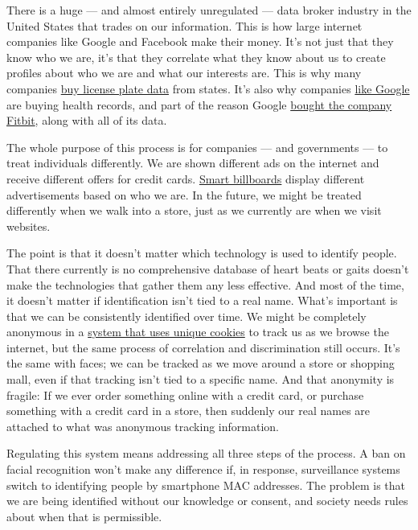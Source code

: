 There is a huge --- and almost entirely unregulated --- data broker
industry in the United States that trades on our information. This is
how large internet companies like Google and Facebook make their money.
It's not just that they know who we are, it's that they correlate what
they know about us to create profiles about who we are and what our
interests are. This is why many companies
\href{https://www.vice.com/en_us/article/43kxzq/dmvs-selling-data-private-investigators-making-millions-of-dollars}{buy
license plate data} from states. It's also why companies
\href{https://www.nytimes.com/2019/11/11/business/google-ascension-health-data.html}{like
Google} are buying health records, and part of the reason Google
\href{https://www.forbes.com/sites/brucelee/2019/11/02/google-to-buy-fitbit-for-21-billion-what-about-privacy-concerns/}{bought
the company Fitbit}, along with all of its data.

The whole purpose of this process is for companies --- and governments
--- to treat individuals differently. We are shown different ads on the
internet and receive different offers for credit cards.
\href{https://www.bloomberg.com/opinion/articles/2018-08-10/google-s-targeted-ads-are-coming-to-a-billboard-near-you}{Smart
billboards} display different advertisements based on who we are. In the
future, we might be treated differently when we walk into a store, just
as we currently are when we visit websites.

The point is that it doesn't matter which technology is used to identify
people. That there currently is no comprehensive database of heart beats
or gaits doesn't make the technologies that gather them any less
effective. And most of the time, it doesn't matter if identification
isn't tied to a real name. What's important is that we can be
consistently identified over time. We might be completely anonymous in a
\href{https://privacy.net/stop-cookies-tracking/}{system that uses
unique cookies} to track us as we browse the internet, but the same
process of correlation and discrimination still occurs. It's the same
with faces; we can be tracked as we move around a store or shopping
mall, even if that tracking isn't tied to a specific name. And that
anonymity is fragile: If we ever order something online with a credit
card, or purchase something with a credit card in a store, then suddenly
our real names are attached to what was anonymous tracking information.

Regulating this system means addressing all three steps of the process.
A ban on facial recognition won't make any difference if, in response,
surveillance systems switch to identifying people by smartphone MAC
addresses. The problem is that we are being identified without our
knowledge or consent, and society needs rules about when that is
permissible.

